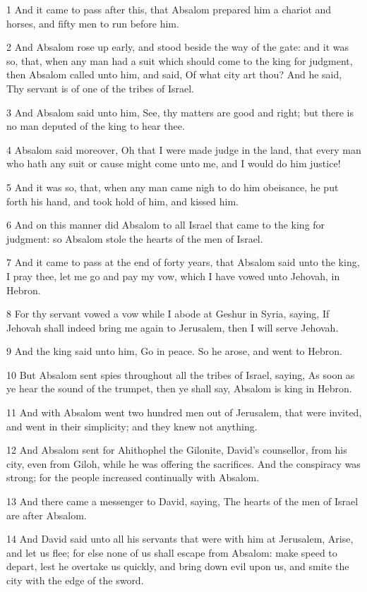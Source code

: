 \par 1 And it came to pass after this, that Absalom prepared him a chariot and horses, and fifty men to run before him.
\par 2 And Absalom rose up early, and stood beside the way of the gate: and it was so, that, when any man had a suit which should come to the king for judgment, then Absalom called unto him, and said, Of what city art thou? And he said, Thy servant is of one of the tribes of Israel.
\par 3 And Absalom said unto him, See, thy matters are good and right; but there is no man deputed of the king to hear thee.
\par 4 Absalom said moreover, Oh that I were made judge in the land, that every man who hath any suit or cause might come unto me, and I would do him justice!
\par 5 And it was so, that, when any man came nigh to do him obeisance, he put forth his hand, and took hold of him, and kissed him.
\par 6 And on this manner did Absalom to all Israel that came to the king for judgment: so Absalom stole the hearts of the men of Israel.
\par 7 And it came to pass at the end of forty years, that Absalom said unto the king, I pray thee, let me go and pay my vow, which I have vowed unto Jehovah, in Hebron.
\par 8 For thy servant vowed a vow while I abode at Geshur in Syria, saying, If Jehovah shall indeed bring me again to Jerusalem, then I will serve Jehovah.
\par 9 And the king said unto him, Go in peace. So he arose, and went to Hebron.
\par 10 But Absalom sent spies throughout all the tribes of Israel, saying, As soon as ye hear the sound of the trumpet, then ye shall say, Absalom is king in Hebron.
\par 11 And with Absalom went two hundred men out of Jerusalem, that were invited, and went in their simplicity; and they knew not anything.
\par 12 And Absalom sent for Ahithophel the Gilonite, David's counsellor, from his city, even from Giloh, while he was offering the sacrifices. And the conspiracy was strong; for the people increased continually with Absalom.
\par 13 And there came a messenger to David, saying, The hearts of the men of Israel are after Absalom.
\par 14 And David said unto all his servants that were with him at Jerusalem, Arise, and let us flee; for else none of us shall escape from Absalom: make speed to depart, lest he overtake us quickly, and bring down evil upon us, and smite the city with the edge of the sword.
